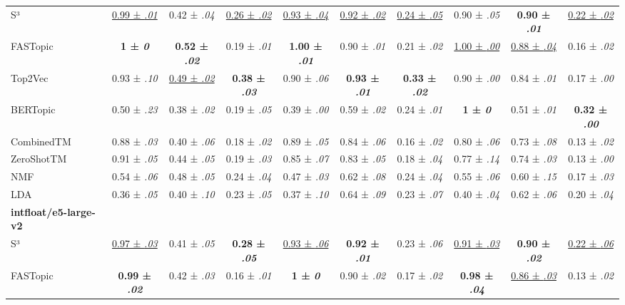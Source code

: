 \begin{table*}[p]
{\begin{tabular}{lccccccccc}
\midrule
S³ & \underline{0.99 ± \textit{.01}} & 0.42 ± \textit{.04} & \underline{0.26 ± \textit{.02}} & \underline{0.93 ± \textit{.04}} & \underline{0.92 ± \textit{.02}} & \underline{0.24 ± \textit{.05}} & 0.90 ± \textit{.05} & \textbf{0.90 ± \textit{.01}} & \underline{0.22 ± \textit{.02}}\\
FASTopic & \textbf{1 ± \textit{0}} & \textbf{0.52 ± \textit{.02}} & 0.19 ± \textit{.01} & \textbf{1.00 ± \textit{.01}} & 0.90 ± \textit{.01} & 0.21 ± \textit{.02} & \underline{1.00 ± \textit{.00}} & \underline{0.88 ± \textit{.04}} & 0.16 ± \textit{.02}\\
Top2Vec & 0.93 ± \textit{.10} & \underline{0.49 ± \textit{.02}} & \textbf{0.38 ± \textit{.03}} & 0.90 ± \textit{.06} & \textbf{0.93 ± \textit{.01}} & \textbf{0.33 ± \textit{.02}} & 0.90 ± \textit{.00} & 0.84 ± \textit{.01} & 0.17 ± \textit{.00}\\
BERTopic & 0.50 ± \textit{.23} & 0.38 ± \textit{.02} & 0.19 ± \textit{.05} & 0.39 ± \textit{.00} & 0.59 ± \textit{.02} & 0.24 ± \textit{.01} & \textbf{1 ± \textit{0}} & 0.51 ± \textit{.01} & \textbf{0.32 ± \textit{.00}}\\
CombinedTM & 0.88 ± \textit{.03} & 0.40 ± \textit{.06} & 0.18 ± \textit{.02} & 0.89 ± \textit{.05} & 0.84 ± \textit{.06} & 0.16 ± \textit{.02} & 0.80 ± \textit{.06} & 0.73 ± \textit{.08} & 0.13 ± \textit{.02}\\
ZeroShotTM & 0.91 ± \textit{.05} & 0.44 ± \textit{.05} & 0.19 ± \textit{.03} & 0.85 ± \textit{.07} & 0.83 ± \textit{.05} & 0.18 ± \textit{.04} & 0.77 ± \textit{.14} & 0.74 ± \textit{.03} & 0.13 ± \textit{.00}\\
NMF & 0.54 ± \textit{.06} & 0.48 ± \textit{.05} & 0.24 ± \textit{.04} & 0.47 ± \textit{.03} & 0.62 ± \textit{.08} & 0.24 ± \textit{.04} & 0.55 ± \textit{.06} & 0.60 ± \textit{.15} & 0.17 ± \textit{.03}\\
LDA & 0.36 ± \textit{.05} & 0.40 ± \textit{.10} & 0.23 ± \textit{.05} & 0.37 ± \textit{.10} & 0.64 ± \textit{.09} & 0.23 ± \textit{.07} & 0.40 ± \textit{.04} & 0.62 ± \textit{.06} & 0.20 ± \textit{.04}\\
\midrule
\textbf{intfloat/e5-large-v2} & & & & & & & & &\\
\midrule
S³ & \underline{0.97 ± \textit{.03}} & 0.41 ± \textit{.05} & \textbf{0.28 ± \textit{.05}} & \underline{0.93 ± \textit{.06}} & \textbf{0.92 ± \textit{.01}} & 0.23 ± \textit{.06} & \underline{0.91 ± \textit{.03}} & \textbf{0.90 ± \textit{.02}} & \underline{0.22 ± \textit{.06}}\\
FASTopic & \textbf{0.99 ± \textit{.02}} & 0.42 ± \textit{.03} & 0.16 ± \textit{.01} & \textbf{1 ± \textit{0}} & 0.90 ± \textit{.02} & 0.17 ± \textit{.02} & \textbf{0.98 ± \textit{.04}} & \underline{0.86 ± \textit{.03}} & 0.13 ± \textit{.02}\\

\end{tabular}}
\end{table*}
